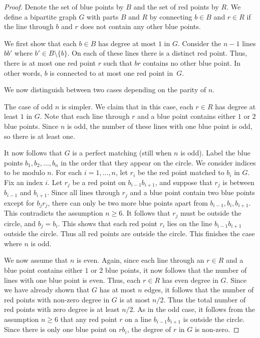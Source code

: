 \documentclass[a4paper,11pt,leqno]{article}
\begin{document}
\begin{proof}
Denote the set of blue points by $B$ and the set of red points by $R$.
We define a bipartite graph $G$ with parts $B$ and $R$ by connecting $b\in B$ and $r\in R$ if the line through $b$ and $r$ does not contain any other blue points.

We first show that each $b\in B$ has degree at most $1$ in $G$.
Consider the $n-1$ lines $bb'$ where $b'\in B\setminus\{b\}$.
On each of these lines there is a distinct red point.
Thus, there is at most one red point $r$ such that $br$ contains no other blue point.
In other words, $b$ is connected to at most one red point in~$G$.

We now distinguish between two cases depending on the parity of $n$.

The case of odd $n$ is simpler.
We claim that in this case, each $r\in R$ has degree at least $1$ in $G$.
Note that each line through $r$ and a blue point contains either $1$ or $2$ blue points.
Since $n$ is odd, the number of these lines with one blue point is odd, so there is at least one.

It now follows that $G$ is a perfect matching (still when $n$ is odd).
Label the blue points $b_1,b_2,\dots,b_n$ in the order that they appear on the circle.
We consider indices to be modulo $n$.
For each $i=1,\dots,n$, let $r_i$ be the red point matched to $b_i$ in $G$.
Fix an index $i$.
Let $r_j$ be a red point on $b_{i-1}b_{i+1}$, and suppose that $r_j$ is between $b_{i-1}$ and $b_{i+1}$.
Since all lines through $r_j$ and a blue point contain two blue points except for $b_jr_j$, there can only be two more blue points apart from $b_{i-1}, b_i, b_{i+1}$.
This contradicts the assumption $n\geq 6$.
It follows that $r_j$ must be outside the circle, and $b_j=b_i$.
This shows that each red point $r_i$ lies on the line $b_{i-1}b_{i+1}$ outside the circle.
Thus all red points are outside the circle.
This finishes the case where $n$ is odd.

We now assume that $n$ is even.
Again, since each line through an $r\in R$ and a blue point contains either $1$ or $2$ blue points, it now follows that the number of lines with one blue point is even.
Thus, each $r\in R$ has even degree in $G$.
Since we have already shown that $G$ has at most $n$ edges, it follows that the number of red points with non-zero degree in $G$ is at most $n/2$.
Thus the total number of red points with zero degree is at least $n/2$.
As in the odd case, it follows from the assumption $n\geq 6$ that any red point $r$ on a line $b_{i-1}b_{i+1}$ is outside the circle.
Since there is only one blue point on $rb_i$, the degree of $r$ in $G$ is non-zero.


\end{proof}
\end{document}
